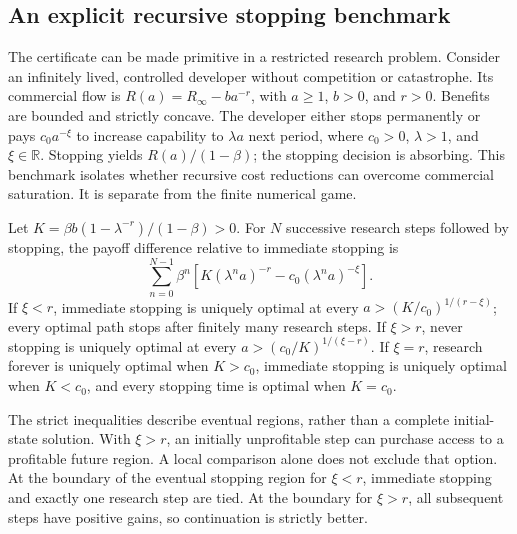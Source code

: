 \subsection{An explicit recursive stopping benchmark}
The certificate can be made primitive in a restricted research problem. Consider an infinitely lived, controlled developer without competition or catastrophe. Its commercial flow is $R(a)=R_\infty-ba^{-r}$, with $a\geq1$, $b>0$, and $r>0$. Benefits are bounded and strictly concave. The developer either stops permanently or pays $c_0a^{-\xi}$ to increase capability to $\lambda a$ next period, where $c_0>0$, $\lambda>1$, and $\xi\in\mathbb R$. Stopping yields $R(a)/(1-\beta)$; the stopping decision is absorbing. This benchmark isolates whether recursive cost reductions can overcome commercial saturation. It is separate from the finite numerical game.

\begin{proposition}\label{prop:recursive}
Let $K=\beta b(1-\lambda^{-r})/(1-\beta)>0$. For $N$ successive research steps followed by stopping, the payoff difference relative to immediate stopping is
\begin{equation}\label{eq:recursivegain}
 \sum_{n=0}^{N-1}\beta^n\left[K(\lambda^na)^{-r}-c_0(\lambda^na)^{-\xi}\right].
\end{equation}
If $\xi<r$, immediate stopping is uniquely optimal at every $a>(K/c_0)^{1/(r-\xi)}$; every optimal path stops after finitely many research steps. If $\xi>r$, never stopping is uniquely optimal at every $a>(c_0/K)^{1/(\xi-r)}$. If $\xi=r$, research forever is uniquely optimal when $K>c_0$, immediate stopping is uniquely optimal when $K<c_0$, and every stopping time is optimal when $K=c_0$.
\end{proposition}

The strict inequalities describe eventual regions, rather than a complete initial-state solution. With $\xi>r$, an initially unprofitable step can purchase access to a profitable future region. A local comparison alone does not exclude that option. At the boundary of the eventual stopping region for $\xi<r$, immediate stopping and exactly one research step are tied. At the boundary for $\xi>r$, all subsequent steps have positive gains, so continuation is strictly better.

